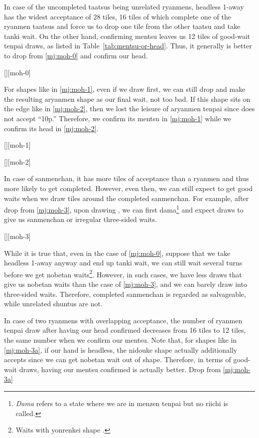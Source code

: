 \documentclass[12pt]{article}
\begin{document}
In case of the uncompleted taatsus being unrelated ryanmens, headless 1-away has the widest acceptance of 28 tiles, 16 tiles of which complete one of the ryanmen taatsus and force us to drop one tile from the other taatsu and take tanki wait. On the other hand, confirming mentsu leaves us 12 tiles of good-wait tenpai draws, as listed in Table~\ref{tab:mentsu-or-head}. Thus, it generally is better to drop  from \ref{mj:moh-0} and confirm our head.

[][moh-0]

For shapes like  in \ref{mj:moh-1}, even if we draw  first, we can still drop  and make the resulting aryanmen shape as our final wait, not too bad. If this shape sits on the edge like  in \ref{mj:moh-2}, then we lost the leisure of aryanmen tenpai since  does not accept ``10p.'' Therefore, we confirm its mentsu in \ref{mj:moh-1} while we confirm its head in \ref{mj:moh-2}.

[][moh-1]

[][moh-2]

In case of sanmenchan, it has more tiles of acceptance than a ryanmen and thus more likely to get completed. However, even then, we can still expect to get good waits when we draw tiles around the completed sanmenchan. For example, after  drop from \ref{mj:moh-3}, upon drawing , we can first dama\footnote{\textit{Dama} refers to a state where we are in menzen tenpai but no riichi is called.} and expect  draws to give us sanmenchan or irregular three-sided waits.

[][moh-3]

While it is true that, even in the case of \ref{mj:moh-0}, suppose that we take headless 1-away anyway and end up tanki wait, we can still wait several turns before we get nobetan waits\footnote{Waits with yonrenkei shape .}. However, in such cases, we have less draws that give us nobetan waits than the case of \ref{mj:moh-3}, and we can barely draw into three-sided waits. Therefore, completed sanmenchan is regarded as salvageable, while unrelated shuntus are not.

In case of two ryanmens with overlapping acceptance, the number of ryanmen tenpai draw after having our head confirmed decreases from 16 tiles to 12 tiles, the same number when we confirm our mentsu. Note that, for shapes like  in \ref{mj:moh-3a}, if our hand is headless, the nidouke shape actually additionally accepts  since we can get nobetan wait out of  shape. Therefore, in terms of good-wait draws, having our mentsu confirmed is actually better. Drop  from \ref{mj:moh-3a}
\end{document}
